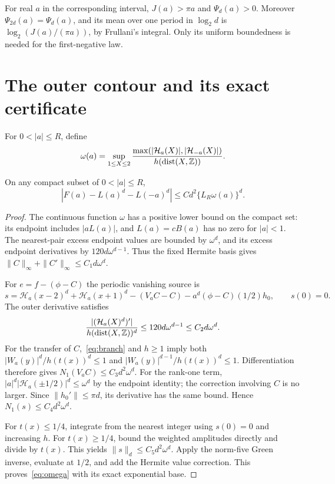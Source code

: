 \documentclass[11pt,a4paper]{article}
\theoremstyle{remark}\newtheorem*{ednote}{Editorial note (ProveIt, 2026-10-01)}
\newcommand{\HH}{\mathcal H}\newcommand{\GG}{\mathcal G}
\begin{document}
For real $a$ in the corresponding interval, $J(a)>\pi a$ and $\Psi_d(a)>0$. Moreover $\Psi_{2d}(a)=\Psi_d(a)$, and its mean over one period in $\log_2d$ is $\log_2(J(a)/(\pi a))$, by Frullani's integral. Only its uniform boundedness is needed for the first-negative law.

\section{The outer contour and its exact certificate}\label{sec:certificate}
For $0<|a|\le R$, define
\[
 \omega(a)=\sup_{1\le X\le2}
 \frac{\max(|\HH_a(X)|,|\HH_{-a}(X)|)}{h(\operatorname{dist}(X,\Z))}.
\]
\begin{lemma}\label{lem:omega}
On any compact subset of $0<|a|\le R$,
\begin{equation}\label{eq:omega}
 |F(a)-L(a)^d-L(-a)^d|\le C d^2\{L_R\omega(a)\}^d.
\end{equation}
\end{lemma}
\begin{proof}
The continuous function $\omega$ has a positive lower bound on the compact set: its endpoint includes $|aL(a)|$, and $L(a)=cB(a)$ has no zero for $|a|<1$. The nearest-pair excess endpoint values are bounded by $\omega^d$, and its excess endpoint derivatives by $120d\omega^{d-1}$. Thus the fixed Hermite basis gives
$\|C\|_\infty+\|C'\|_\infty\le C_1d\omega^d$.

For $e=f-(\phi-C)$ the periodic vanishing source is
\[
 s=\HH_a(x-2)^d+\HH_a(x+1)^d-(V_aC-C)-a^d(\phi-C)(1/2)h_0,
 \qquad s(0)=0.
\]
The outer derivative satisfies
\[
 \frac{|(\HH_a(X)^d)'|}{h(\operatorname{dist}(X,\Z))^d}
 \le120d\omega^{d-1}\le C_2d\omega^d.
\]
For the transfer of $C$,~\eqref{eq:branch} and $h\ge1$ imply both
$|W_a(y)|^d/h(t(x))^d\le1$ and
$|W_a(y)|^{d-1}/h(t(x))^d\le1$.
Differentiation therefore gives $N_1(V_aC)\le C_3d^2\omega^d$.
For the rank-one term, $|a|^d|\HH_a(\pm1/2)|^d\le\omega^d$ by the endpoint identity; the correction involving $C$ is no larger. Since $\|h_0'\|\le\pi d$, its derivative has the same bound. Hence $N_1(s)\le C_4d^2\omega^d$.

For $t(x)\le1/4$, integrate from the nearest integer using $s(0)=0$ and increasing $h$. For $t(x)\ge1/4$, bound the weighted amplitudes directly and divide by $t(x)$. This yields $\|s\|_d\le C_5d^2\omega^d$. Apply the norm-five Green inverse, evaluate at $1/2$, and add the Hermite value correction. This proves~\eqref{eq:omega} with its exact exponential base.
\end{proof}
\end{document}
